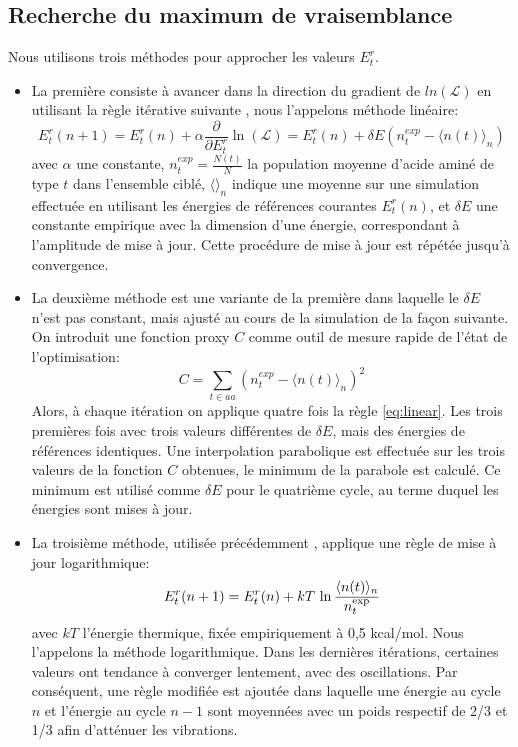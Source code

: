 \subsection{Recherche du maximum de vraisemblance}
Nous utilisons trois méthodes pour approcher les valeurs ${E^r_t}$.
\begin{itemize}
  \label{enumMeth}
\item La première consiste à avancer dans la direction du gradient de $ln(\mathcal{L})$ en utilisant la règle itérative suivante \cite{Kleinman06}, nous l'appelons méthode linéaire:
\begin{equation} \label {eq:linear}
  E^r_t(n+1) = E^r_t(n) + \alpha \frac{\partial}{\partial E^r_t} \ln(\mathcal{L})=E^r_t(n) + \delta E (n^{exp}_t - \langle n(t)\rangle_n)
\end{equation} 
avec $\alpha$ une constante, $n^{exp}_t = \frac{N(t)}{N}$ la population moyenne d'acide aminé de type $t$ dans l'ensemble ciblé, $\langle\rangle_n$ indique une moyenne sur une simulation effectuée en utilisant les énergies de références courantes ${E^r_t(n)}$, et $\delta E$ une constante empirique avec la dimension d'une énergie, correspondant à l'amplitude de mise à jour. Cette procédure de mise à jour est répétée jusqu'à convergence.
\item La deuxième méthode est une variante de la première dans laquelle le $\delta E$ n'est pas constant, mais ajusté au cours de la simulation de la façon suivante. On introduit une fonction proxy $C$ comme outil de mesure rapide de l'état de l'optimisation:
\begin{equation} \label {eq:proxy_function}
C =\sum_{t \in aa}(n^{exp}_t - \langle n(t)\rangle_n )^2
\end{equation} 
Alors, à chaque itération on applique quatre fois la règle \ref{eq:linear}. Les trois premières fois avec trois valeurs différentes de $\delta E$, mais des énergies de références identiques. Une interpolation parabolique est effectuée sur les trois valeurs de la fonction $C$ obtenues, le minimum de la parabole est calculé. Ce minimum est utilisé comme $\delta E$ pour le quatrième cycle, au terme duquel les énergies sont mises à jour.
\item La troisième méthode, utilisée précédemment \cite{Schmidt08, Simonson13b}, applique une règle de mise à jour logarithmique:
\begin{equation} \label{eq:log}
E^r_t (n+1) = E^r_t (n) + kT \, \ln \frac{\langle n(t) \rangle_n}{n_t^{\rm exp}}
\end{equation}
avec $kT$ l'énergie thermique, fixée empiriquement à 0,5 kcal/mol. Nous l'appelons la méthode logarithmique. Dans les dernières itérations, certaines valeurs ont tendance à converger lentement, avec des oscillations. Par conséquent, une règle modifiée est ajoutée dans laquelle une énergie au cycle $n$ et l'énergie au cycle  $n-1$ sont moyennées avec un poids respectif de 2/3 et 1/3 afin d'atténuer les vibrations.

\end{itemize}

